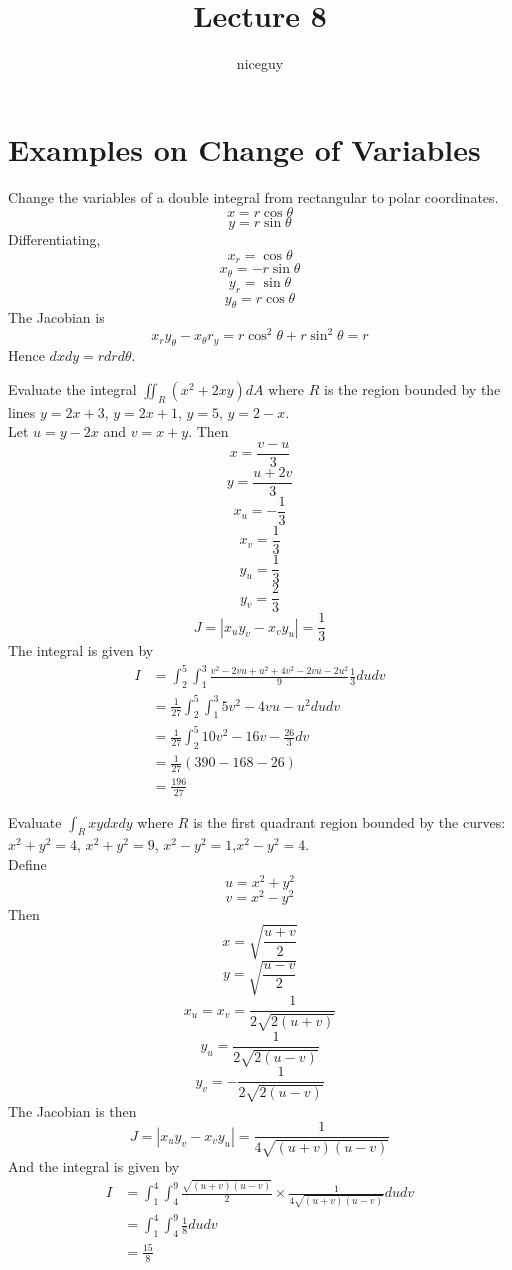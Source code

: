 \documentclass[12pt]{article}
\author{niceguy}
\title{Lecture 8}
\begin{document}
\maketitle

\section{Examples on Change of Variables}

\begin{ex}
	Change the variables of a double integral from rectangular to polar coordinates.
	$$x = r\cos\theta$$
	$$y = r\sin\theta$$
	Differentiating,
	$$x_r = \cos\theta$$
	$$x_\theta = -r\sin\theta$$
	$$y_r = \sin\theta$$
	$$y_\theta = r\cos\theta$$
	The Jacobian is
	$$x_ry_\theta - x_\theta r_y = r\cos^2\theta+r\sin^2\theta = r$$
	Hence $dxdy = rdrd\theta$.
\end{ex}

\begin{ex}
	Evaluate the integral $\iint_R(x^2+2xy)dA$ where $R$ is the region bounded by the lines $y=2x+3$, $y=2x+1$, $y=5$, $y=2-x$. \\
	Let $u=y-2x$ and $v = x+y$. Then
	$$x = \frac{v-u}{3}$$
	$$y = \frac{u+2v}{3}$$
	$$x_u = -\frac{1}{3}$$
	$$x_v = \frac{1}{3}$$
	$$y_u = \frac{1}{3}$$
	$$y_v = \frac{2}{3}$$
	$$J = |x_uy_v - x_vy_u| = \frac{1}{3}$$
	The integral is given by
	\begin{align*}
	I &= \int_2^5 \int_1^3 \frac{v^2-2vu+u^2+4v^2-2vu-2u^2}{9} \frac{1}{3}dudv \\
		  &= \frac{1}{27} \int_2^5 \int_1^3 5v^2 - 4vu - u^2 dudv \\
		  &= \frac{1}{27} \int_2^5 10v^2 - 16v - \frac{26}{3} dv \\
		  &= \frac{1}{27} (390 - 168 - 26) \\
		  &= \frac{196}{27}
	\end{align*}
\end{ex}

\begin{ex}
	Evaluate $\int_Rxydxdy$ where $R$ is the first quadrant region bounded by the curves: $x^2+y^2=4$, $x^2+y^2=9$, $x^2-y^2=1$,$x^2-y^2=4$. \\
	Define
	$$u = x^2+y^2$$
	$$v = x^2-y^2$$
	Then
	$$x = \sqrt{\frac{u+v}{2}}$$
	$$y = \sqrt{\frac{u-v}{2}}$$
	$$x_u = x_v = \frac{1}{2\sqrt{2(u+v)}}$$
	$$y_u = \frac{1}{2\sqrt{2(u-v)}}$$
	$$y_v = -\frac{1}{2\sqrt{2(u-v)}}$$
	The Jacobian is then
	$$J = |x_uy_v - x_vy_u| = \frac{1}{4\sqrt{(u+v)(u-v)}}$$
	And the integral is given by
	\begin{align*}
		I &= \int_1^4\int_4^9 \frac{\sqrt{(u+v)(u-v)}}{2} \times \frac{1}{4\sqrt{(u+v)(u-v)}} dudv \\
		  &= \int_1^4\int_4^9 \frac{1}{8} dudv \\
		  &= \frac{15}{8}
	\end{align*}
\end{ex}
\end{document}
